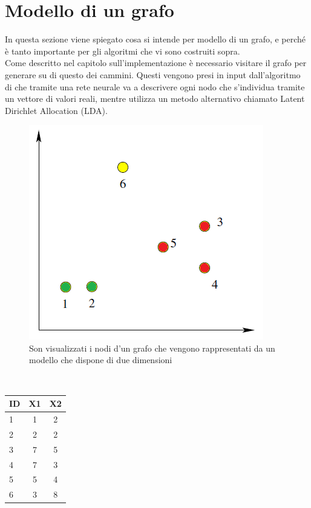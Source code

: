 \section{Modello di un grafo}
In questa sezione viene spiegato cosa si intende per modello di un grafo, e perché è tanto importante per gli algoritmi che vi sono costruiti sopra.\\
Come descritto nel capitolo sull'implementazione è necessario visitare il grafo per generare su di questo dei cammini. Questi vengono presi in input dall'algoritmo di \wv che tramite una rete neurale va a descrivere ogni nodo che s'individua tramite un vettore di valori reali, mentre \cnrl utilizza un metodo alternativo chiamato Latent Dirichlet Allocation (LDA)\cite{LDA}.\\
\begin{figure}[htp]
	\centering
	\includegraphics{immagini/punti_modello}
	\caption{Son visualizzati i nodi d'un grafo che vengono rappresentati da un modello che dispone di due dimensioni}
	\label{fig:grafico_modello}
\end{figure}
\\
\begin{center}
	\begin{tabular}{|l|cc|}
		\hline
		ID&X1&X2\\
		\hline
		1 & 1 & 2\\
		2 & 2 & 2\\
		3 & 7 & 5\\
		4 & 7 & 3\\
		5 & 5 & 4\\
		6 & 3 & 8\\
		\hline
	\end{tabular}
	\label{tab:coordinate_modello}
\end{center}
